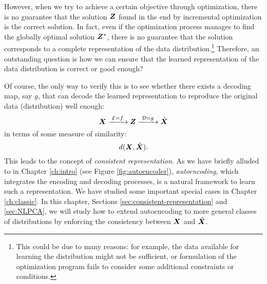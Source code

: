 \documentclass[../../book-main.tex]{subfiles}
\begin{document}
However, when we try to achieve a certain objective through
optimization, there is no guarantee that the solution $\bm{Z}$ found in
the end by incremental optimization is the correct solution. In fact, even if
the optimization process manages to find the globally optimal
solution $\bm{Z}^*$, there is no guarantee that the solution corresponds
to a complete representation of the data distribution.\footnote{This could be due to many reasons: for example, the data available for learning the distribution might not be sufficient, or formulation of the optimization program fails to consider some additional constraints or conditions.} Therefore, an outstanding question is how we can ensure that the learned representation of the data distribution is
correct or good enough? 

Of course, the only way to verify this is to see whether there exists a decoding map, say $g$, that can decode the learned representation to reproduce the original data (distribution) well enough:
\begin{equation}
  \bm{X}
  \xrightarrow{\hspace{1mm} \mathcal{E} = f \hspace{1mm}} \bm{Z}
  \xrightarrow{\hspace{1mm} \mathcal{D} = g \hspace{1mm}} \hat{\bm{X}}
\end{equation}
in terms of some measure of similarity:
\begin{equation}
  d(\bm{X}, \hat {\bm{X}}).
\end{equation}
This leads to the concept of {\em consistent representation}. As we have briefly alluded to in
Chapter \ref{ch:intro} (see Figure \ref{fig:autoencoder}), {\em autoencoding}, which integrates the
encoding and decoding processes, is a natural framework to learn such a representation. We have studied some important special cases in Chapter \ref{ch:classic}. In
this chapter, Sections \ref{sec:consistent-representation} and \ref{sec:NLPCA}, we will study how to extend autoencoding to
more general classes of distributions by enforcing the consistency between $\bm{X}$ and $\hat {\bm{X}}$.
\end{document}
